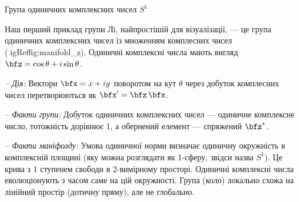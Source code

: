 
\begin{fexample}	{Група одиничних комплексних чисел $S^1$}
\label{ex:S1}

Наш перший приклад групи Лі, найпростішій для візуалізації, — це група одиничних комплексних чисел із множенням комплесних чисел (igRef{fig:manifold_z}).
Одиничні комплексні числа мають вигляд $
\bfz=\cos\theta+i\sin\theta$.

\emph{-- Дія:}
 Вектори $
\bfx=x+iy$ поворотом на кут $
\theta$ через добуток комплесних чисел перетворюються як $
\bfx'=\bfz\,\bfx$. 

\emph{-- Факти групи:}
Добуток одиничних комплексних чисел — одиничне комплексне число, тотожність дорівнює 1, а обернений елемент — спряжений $
\bfz^*$.

\emph{-- Факти маніфолду:} 
Умова одиничної норми визначає одиничну окружність в комплексній площині (яку можна розглядати як 1-сферу, звідси назва $S^1$).
Це крива з 1 ступенем свободи в 2-вимірному просторі.
Одиничні комплексні числа еволюціонують з часом саме на цій окружності.
Група (коло) локально схожа на лінійний простір (дотичну пряму), але не глобально.
\end{fexample}

